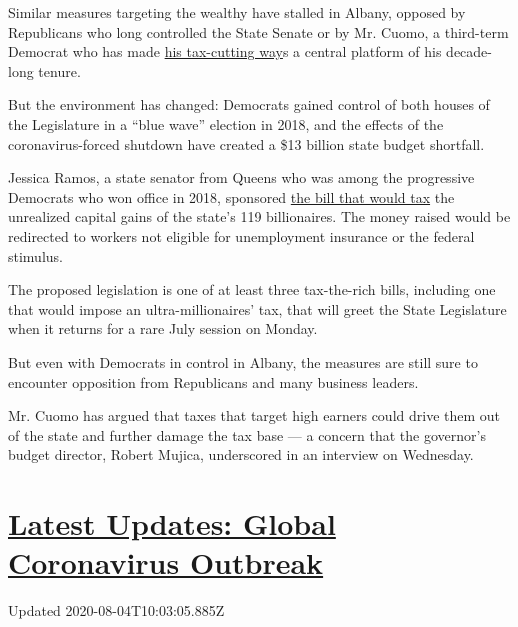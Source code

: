 Similar measures targeting the wealthy have stalled in Albany, opposed
by Republicans who long controlled the State Senate or by Mr. Cuomo, a
third-term Democrat who has made
\href{https://news.bloombergtax.com/daily-tax-report-state/cuomo-proposes-n-y-tax-cuts-for-small-businesses-farmers}{his
tax-cutting way}s a central platform of his decade-long tenure.

But the environment has changed: Democrats gained control of both houses
of the Legislature in a ``blue wave'' election in 2018, and the effects
of the coronavirus-forced shutdown have created a \$13 billion state
budget shortfall.

Jessica Ramos, a state senator from Queens who was among the progressive
Democrats who won office in 2018, sponsored
\href{https://legislation.nysenate.gov/pdf/bills/2019/S8277}{the bill
that would tax} the unrealized capital gains of the state's 119
billionaires. The money raised would be redirected to workers not
eligible for unemployment insurance or the federal stimulus.

The proposed legislation is one of at least three tax-the-rich bills,
including one that would impose an ultra-millionaires' tax, that will
greet the State Legislature when it returns for a rare July session on
Monday.

But even with Democrats in control in Albany, the measures are still
sure to encounter opposition from Republicans and many business leaders.

Mr. Cuomo has argued that taxes that target high earners could drive
them out of the state and further damage the tax base --- a concern that
the governor's budget director, Robert Mujica, underscored in an
interview on Wednesday.

\hypertarget{latest-updates-global-coronavirus-outbreak}{%
\section{\texorpdfstring{\href{https://www.nytimes.com/2020/08/04/world/coronavirus-covid-19.html?action=click\&pgtype=Article\&state=default\&region=MAIN_CONTENT_1\&context=storylines_live_updates}{Latest
Updates: Global Coronavirus
Outbreak}}{Latest Updates: Global Coronavirus Outbreak}}\label{latest-updates-global-coronavirus-outbreak}}

Updated 2020-08-04T10:03:05.885Z

